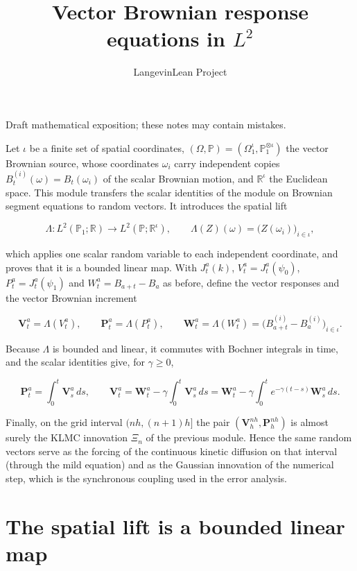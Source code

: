 \documentclass[11pt,a4paper]{article}
\title{\texorpdfstring{Vector Brownian response equations in \(L^{2}\)}{Vector Brownian response equations in L²}}
\author{LangevinLean Project}
\date{}
\begin{document}
\maketitle
Draft mathematical exposition; these notes may contain mistakes.


Let \(\iota\) be a finite set of spatial coordinates, \((\Omega,\mathbb P)=(\Omega_1^\iota,\mathbb P_1^{\otimes\iota})\) the vector Brownian source, whose coordinates \(\omega_i\) carry independent copies \(B^{(i)}_t(\omega)=B_t(\omega_i)\) of the scalar Brownian motion, and \(\mathbb R^\iota\) the Euclidean space. This module transfers the scalar identities of the module on Brownian segment equations to random vectors. It introduces the spatial lift


\[\Lambda:L^2(\mathbb P_1;\mathbb R)\to L^2(\mathbb P;\mathbb R^\iota),\qquad\Lambda(Z)(\omega)=\bigl(Z(\omega_i)\bigr)_{i\in\iota},\]


which applies one scalar random variable to each independent coordinate, and proves that it is a bounded linear map. With \(J^a_t(k)\), \(V^a_t=J^a_t(\psi_0)\), \(P^a_t=J^a_t(\psi_1)\) and \(W^a_t=B_{a+t}-B_a\) as before, define the vector responses and the vector Brownian increment


\[\mathbf V^a_t=\Lambda(V^a_t),\qquad\mathbf P^a_t=\Lambda(P^a_t),\qquad\mathbf W^a_t=\Lambda(W^a_t)=\bigl(B^{(i)}_{a+t}-B^{(i)}_a\bigr)_{i\in\iota}.\]


Because \(\Lambda\) is bounded and linear, it commutes with Bochner integrals in time, and the scalar identities give, for \(\gamma\ge0\),


\[\mathbf P^a_t=\int_0^t\mathbf V^a_s\,ds,\qquad\mathbf V^a_t=\mathbf W^a_t-\gamma\int_0^t\mathbf V^a_s\,ds=\mathbf W^a_t-\gamma\int_0^te^{-\gamma(t-s)}\mathbf W^a_s\,ds .\]


Finally, on the grid interval \((nh,(n+1)h]\) the pair \((\mathbf V^{nh}_h,\mathbf P^{nh}_h)\) is almost surely the KLMC innovation \(\Xi_n\) of the previous module. Hence the same random vectors serve as the forcing of the continuous kinetic diffusion on that interval (through the mild equation) and as the Gaussian innovation of the numerical step, which is the synchronous coupling used in the error analysis.


\section{\texorpdfstring{The spatial lift is a bounded linear map}{The spatial lift is a bounded linear map}}
\end{document}
